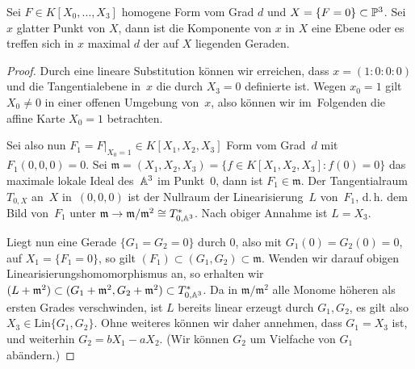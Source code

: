 \begin{theorem} \label{th:local}
Sei $F \in K[X_0, \dots, X_3]$ homogene Form vom Grad $d$ und $X = \{F = 0\} \subset \mathbb P^{3}$. Sei $x$ glatter Punkt von $X$, dann ist die Komponente von $x$ in $X$ eine Ebene oder es treffen sich in $x$ maximal $d$ der auf $X$ liegenden Geraden.
\end{theorem}
\begin{proof}
Durch eine lineare Substitution können wir erreichen, dass $x = (1:0:0:0)$ und die Tangentialebene in~$x$ die durch $X_3 = 0$ definierte ist. Wegen $x_0 = 1$ gilt $X_0 \neq 0$ in einer offenen Umgebung von~$x$, also können wir im~Folgenden die affine Karte ${X_0 = 1}$ betrachten.

Sei also nun $F_1 = \left. F \right|_{X_0=1} \in K[X_1, X_2, X_3]$ Form vom Grad~$d$ mit $F_1(0,0,0) = 0$. Sei $\mathfrak m = (X_1, X_2, X_3) = \{ f \in K[X_1, X_2, X_3] : f(0) = 0 \}$ das maximale lokale Ideal des~$\mathbb A^{3}$ im Punkt~$0$, dann ist $F_1 \in \mathfrak m$. Der Tangentialraum $T_{0,X}$ an~$X$ in~$(0,0,0)$ ist der Nullraum der Linearisierung~$L$ von~$F_1$, d.\,h. dem Bild von~$F_1$ unter $\mathfrak m \rightarrow \mathfrak m/\mathfrak m^2 \cong T_{0,\mathbb A^{3}}^*$. Nach obiger Annahme ist $L = X_3$.

Liegt nun eine Gerade $\{G_1 = G_2 = 0\}$ durch $0$, also mit $G_1(0) = G_2(0) = 0$, auf $X_1 = \{F_1 = 0\}$, so gilt $(F_1) \subset (G_1, G_2) \subset \mathfrak m$. Wenden wir darauf obigen Linearisierungshomomorphismus an, so erhalten wir $(L + \mathfrak m^2) \subset (G_1 + \mathfrak m^2, G_2 + \mathfrak m^2) \subset T_{0,\mathbb A^{3}}^*$. Da in $\mathfrak m/\mathfrak m^2$ alle Monome höheren als ersten Grades verschwinden, ist $L$ bereits linear erzeugt durch $G_1, G_2$, es gilt also $X_3 \in \mathrm{Lin}\{G_1, G_2\}$. Ohne weiteres können wir daher annehmen, dass $G_1 = X_3$ ist, und weiterhin $G_2 = bX_1 - aX_2$. (Wir können $G_2$ um Vielfache von $G_1$ abändern.)


\end{proof}
